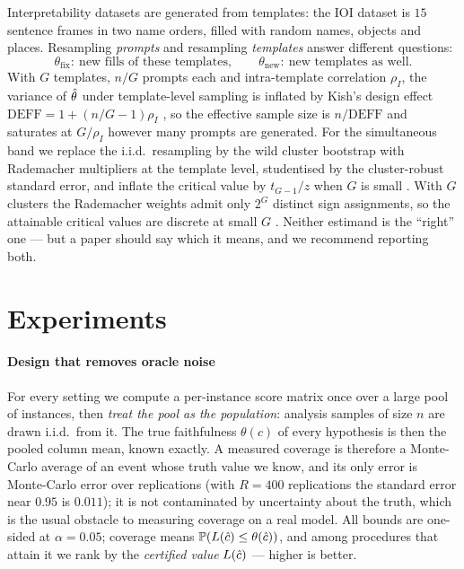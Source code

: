 Interpretability datasets are generated from templates: the IOI dataset is
$15$ sentence frames in two name orders, filled with random names, objects and
places. Resampling \emph{prompts} and resampling \emph{templates} answer different
questions:
\[
\theta_{\text{fix}}:\ \text{new fills of these templates},
\qquad
\theta_{\text{new}}:\ \text{new templates as well}.
\]
With $G$ templates, $n/G$ prompts each and intra-template correlation $\rho_I$,
the variance of $\hat{\theta}$ under template-level sampling is inflated by Kish's
design effect $\mathrm{DEFF}=1+(n/G-1)\rho_I$ \citep{kish1965survey}, so the effective sample size is
$n/\mathrm{DEFF}$ and saturates at $G/\rho_I$ however many prompts are generated.
For the simultaneous band we replace the i.i.d.\ resampling by the wild
cluster bootstrap \citep{cameron2008bootstrap,field2007bootstrapping} with
Rademacher multipliers at the template level, studentised by the cluster-robust
standard error, and inflate the critical value by $t_{G-1}/z$ when $G$ is small
\citep{cameron2015practitioner}. With $G$ clusters the Rademacher weights admit
only $2^G$ distinct sign assignments, so the attainable critical values are
discrete at small $G$ \citep{webb2023reworking,mnw2023clusterrobust}.
Neither estimand is the ``right'' one --- but a paper should say which it means,
and we recommend reporting both.

\section{Experiments}
\label{sec:experiments}

\paragraph{Design that removes oracle noise}
For every setting we compute a per-instance score matrix once over a large pool
of instances, then \emph{treat the pool as the population}: analysis samples of
size $n$ are drawn i.i.d.\ from it. The true faithfulness $\theta(c)$ of every
hypothesis is then the pooled column mean, known exactly. A measured coverage
is therefore a Monte-Carlo average of an event whose truth value we know, and
its only error is Monte-Carlo error over replications (with $R=400$ replications
the standard error near $0.95$ is $0.011$); it is not contaminated by
uncertainty about the truth, which is the usual obstacle to measuring coverage on
a real model. All bounds are one-sided at $\alpha=0.05$; coverage means
$\mathbb{P}(L(\hat{c})\le\theta(\hat{c}))$, and among procedures that attain it we rank
by the \emph{certified value} $L(\hat{c})$ --- higher is better.

